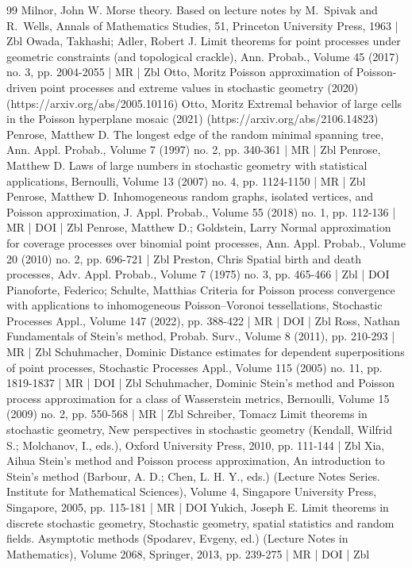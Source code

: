 \documentclass[10pt]{amsart}
\theoremstyle{definition}\newtheorem{defi}[theo]{Definition}\newtheorem{rema}[theo]{Remark}\newtheorem{exam}[theo]{Example}\newtheorem{exem}[theo]{Example}\newtheorem{nota}[theo]{Notation}
\begin{document}
\begin{thebibliography}{99}
Milnor, John W. Morse theory. Based on lecture notes by M. Spivak and R. Wells, Annals of Mathematics Studies, 51, Princeton University Press, 1963 | Zbl
Owada, Takhashi; Adler, Robert J. Limit theorems for point processes under geometric constraints (and topological crackle), Ann. Probab., Volume 45 (2017) no. 3, pp. 2004-2055 | MR | Zbl
Otto, Moritz Poisson approximation of Poisson-driven point processes and extreme values in stochastic geometry (2020) (https://arxiv.org/abs/2005.10116)
Otto, Moritz Extremal behavior of large cells in the Poisson hyperplane mosaic (2021) (https://arxiv.org/abs/2106.14823)
Penrose, Matthew D. The longest edge of the random minimal spanning tree, Ann. Appl. Probab., Volume 7 (1997) no. 2, pp. 340-361 | MR | Zbl
Penrose, Matthew D. Laws of large numbers in stochastic geometry with statistical applications, Bernoulli, Volume 13 (2007) no. 4, pp. 1124-1150 | MR | Zbl
Penrose, Matthew D. Inhomogeneous random graphs, isolated vertices, and Poisson approximation, J. Appl. Probab., Volume 55 (2018) no. 1, pp. 112-136 | MR | DOI | Zbl
Penrose, Matthew D.; Goldstein, Larry Normal approximation for coverage processes over binomial point processes, Ann. Appl. Probab., Volume 20 (2010) no. 2, pp. 696-721 | Zbl
Preston, Chris Spatial birth and death processes, Adv. Appl. Probab., Volume 7 (1975) no. 3, pp. 465-466 | Zbl | DOI
Pianoforte, Federico; Schulte, Matthias Criteria for Poisson process convergence with applications to inhomogeneous Poisson–Voronoi tessellations, Stochastic Processes Appl., Volume 147 (2022), pp. 388-422 | MR | DOI | Zbl
Ross, Nathan Fundamentals of Stein’s method, Probab. Surv., Volume 8 (2011), pp. 210-293 | MR | Zbl
Schuhmacher, Dominic Distance estimates for dependent superpositions of point processes, Stochastic Processes Appl., Volume 115 (2005) no. 11, pp. 1819-1837 | MR | DOI | Zbl
Schuhmacher, Dominic Stein’s method and Poisson process approximation for a class of Wasserstein metrics, Bernoulli, Volume 15 (2009) no. 2, pp. 550-568 | MR | Zbl
Schreiber, Tomacz Limit theorems in stochastic geometry, New perspectives in stochastic geometry (Kendall, Wilfrid S.; Molchanov, I., eds.), Oxford University Press, 2010, pp. 111-144 | Zbl
Xia, Aihua Stein’s method and Poisson process approximation, An introduction to Stein’s method (Barbour, A. D.; Chen, L. H. Y., eds.) (Lecture Notes Series. Institute for Mathematical Sciences), Volume 4, Singapore University Press, Singapore, 2005, pp. 115-181 | MR | DOI
Yukich, Joseph E. Limit theorems in discrete stochastic geometry, Stochastic geometry, spatial statistics and random fields. Asymptotic methods (Spodarev, Evgeny, ed.) (Lecture Notes in Mathematics), Volume 2068, Springer, 2013, pp. 239-275 | MR | DOI | Zbl
\end{thebibliography}
\end{document}
